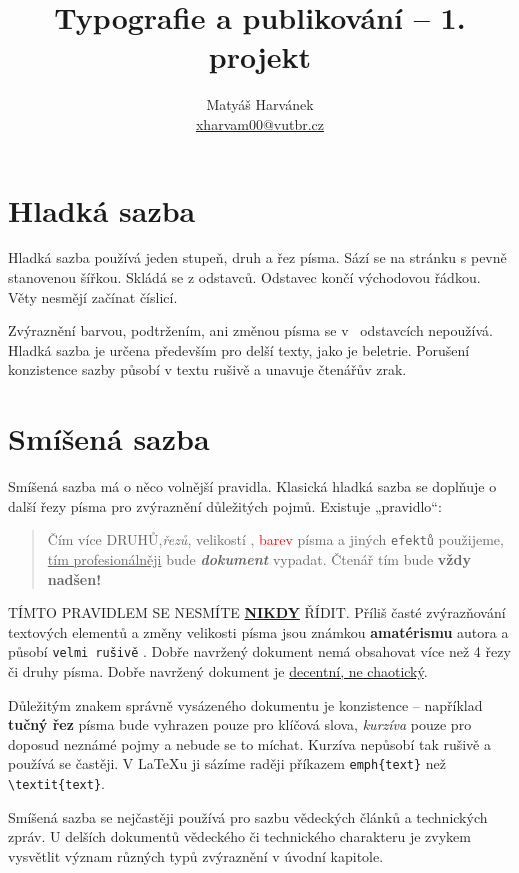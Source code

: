 \documentclass[a4paper, twocolumn, 10pt]{article}
\title{Typografie a publikování – 1. projekt}
\author{Matyáš Harvánek \\\href{mailto:xharvam00@vutbr.cz}{xharvam00@vutbr.cz}}
\date{}
\begin{document}
\maketitle

\section{Hladká sazba}
Hladká sazba používá jeden stupeň, druh a řez písma. Sází
se na stránku s pevně stanovenou šířkou. Skládá se z odstavců. Odstavec končí východovou řádkou. Věty nesmějí
začínat číslicí. 

  Zvýraznění barvou, podtržením, ani změnou písma se
v~ odstavcích nepoužívá. Hladká sazba je určena především
pro delší texty, jako je beletrie. Porušení konzistence sazby
působí v textu rušivě a unavuje čtenářův zrak.


\section{Smíšená sazba}

Smíšená sazba má o něco volnější pravidla. Klasická hladká
sazba se doplňuje o další řezy písma pro zvýraznění důležitých pojmů. Existuje „pravidlo“:
\begin{quote}
\hspace{1em} Čím více \MakeUppercase{druhů},\textit{řezů},  {\tiny{velikostí}} , {\textcolor{red}{barev}}  písma
a jiných {\texttt{efektů}}  použijeme, {\underline{tím profesionálněji}}
bude  {\textit{\textbf{\small{dokument}}}} vypadat. Čtenář tím bude {\LARGE{\textbf{vždy nadšen!}}} 
\end{quote}

\MakeUppercase{Tímto pravidlem se nesmíte {\textbf{\underline{nikdy}}} řídit}. Příliš časté zvýrazňování textových elementů a změny {\tiny{velikosti}}
písma jsou známkou {\textbf{amatérismu}} autora a působí {\texttt{velmi
rušivě}} . Dobře navržený dokument nemá obsahovat více
než 4 řezy či druhy písma. Dobře navržený dokument je
{\underline{decentní, ne chaotický}}.

Důležitým znakem správně vysázeného dokumentu je
konzistence – například {\textbf{tučný řez}} písma bude vyhrazen
pouze pro klíčová slova, {\textit{kurzíva}} pouze pro doposud neznámé pojmy a nebude se to míchat. Kurzíva  nepůsobí tak
rušivě a používá se častěji. V \LaTeX{}u ji sázíme raději příkazem {\verb|emph{text}|} než {\verb|\textit{text}|}.

Smíšená sazba se nejčastěji používá pro sazbu vědeckých
článků a technických zpráv. U delších dokumentů vědeckého či technického charakteru je zvykem vysvětlit význam
různých typů zvýraznění v úvodní kapitole.
\end{document}
